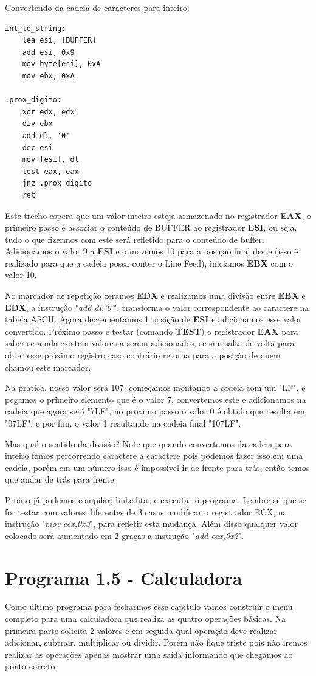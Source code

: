 Convertendo da cadeia de caracteres para inteiro:
\begin{lstlisting}[]
int_to_string:
	lea esi, [BUFFER]
	add esi, 0x9
	mov byte[esi], 0xA
	mov ebx, 0xA

.prox_digito:
	xor edx, edx
	div ebx
	add dl, '0'
	dec esi
	mov [esi], dl
	test eax, eax
	jnz .prox_digito
	ret
\end{lstlisting}

Este trecho espera que um valor inteiro esteja armazenado no registrador \textbf{EAX}, o primeiro passo é associar o conteúdo de BUFFER ao registrador \textbf{ESI}, ou seja, tudo o que fizermos com este será refletido para o conteúdo de buffer. Adicionamos o valor 9 a \textbf{ESI} e o movemos 10 para a posição final deste (isso é realizado para que a cadeia possa conter o Line Feed), iniciamos \textbf{EBX} com o valor 10.

No marcador de repetição zeramos \textbf{EDX} e realizamos uma divisão entre \textbf{EBX} e \textbf{EDX}, a instrução "\textit{add dl,'0'}", transforma o valor correspondente ao caractere na tabela ASCII. Agora decrementamos 1 posição de \textbf{ESI} e adicionamos esse valor convertido. Próximo passo é testar (comando \textbf{TEST}) o registrador \textbf{EAX} para saber se ainda existem valores a serem adicionados, se sim salta de volta para obter esse próximo registro caso contrário retorna para a posição de quem chamou este marcador.

Na prática, nosso valor será 107, começamos montando a cadeia com um "LF", e pegamos o primeiro elemento que é o valor 7, convertemos este e adicionamos na cadeia que agora será "7LF", no próximo passo o valor 0 é obtido que resulta em "07LF", e por fim, o valor 1 resultando na cadeia final "107LF".

Mas qual o sentido da divisão? Note que quando convertemos da cadeia para inteiro fomos percorrendo caractere a caractere pois podemos fazer isso em uma cadeia, porém em um número isso é impossível ir de frente para trás, então temos que andar de trás para frente.

Pronto já podemos compilar, linkeditar e executar o programa. Lembre-se que se for testar com valores diferentes de 3 casas modificar o registrador ECX, na instrução "\textit{mov ecx,0x3}", para refletir esta mudança. Além disso qualquer valor colocado será aumentado em 2 graças a instrução "\textit{add eax,0x2}".

\section{Programa 1.5 - Calculadora}
Como último programa para fecharmos esse capítulo vamos construir o menu completo para uma calculadora que realiza as quatro operações básicas. Na primeira parte solicita 2 valores e em seguida qual operação deve realizar adicionar, subtrair, multiplicar ou dividir. Porém não fique triste pois não iremos realizar as operações apenas mostrar uma saída informando que chegamos ao ponto correto.

